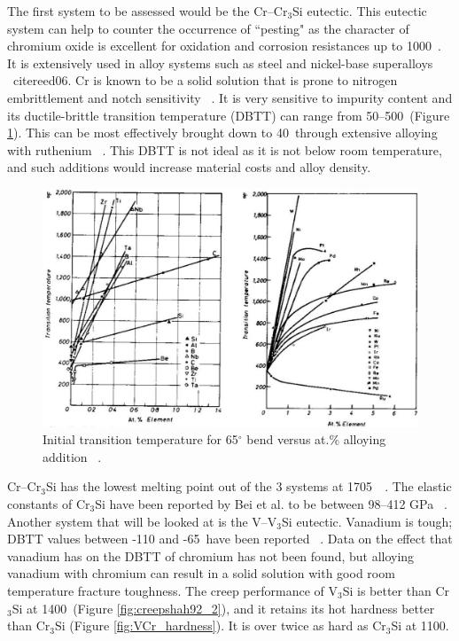 The first system to be assessed would be the Cr--Cr$_3$Si eutectic.  This eutectic system can help to counter the occurrence of ``pesting" as the character of chromium oxide is excellent for oxidation and corrosion resistances up to 1000\celsius ~\cite{raj95a}.  It is extensively used in alloy systems such as steel and nickel-base superalloys ~cite{reed06}. Cr is known to be a solid solution that is prone to nitrogen embrittlement and notch sensitivity ~\cite{abrahamson57}.  It is very sensitive to impurity content and its ductile-brittle transition temperature (DBTT) can range from 50--500\celsius\ (Figure \ref{fig:Cr_ductility}).  This can be most effectively brought down to 40\celsius\ through extensive alloying with ruthenium ~\cite{abrahamson57}.  This DBTT is not ideal as it is not below room temperature, and such additions would increase material costs and alloy density.
%
\begin{figure}[H]
\begin{center}
\includegraphics[width=.98\textwidth]{Cr_ductility}
\vspace{-2mm}
\caption{Initial transition temperature for 65$^\circ$ bend versus at.\% alloying addition ~\cite{abrahamson57}. }\label{fig:Cr_ductility}
\end{center}
\end{figure}
\vspace{-8mm}
%
Cr--Cr$_3$Si has the lowest melting point out of the 3 systems at 1705\celsius\ ~\cite{gokhale90}. The elastic constants of Cr$_3$Si have been reported by Bei et al.  to be between 98--412 GPa ~\cite{bei04}. Another system that will be looked at is the V--V$_3$Si eutectic.  Vanadium is tough; DBTT values between -110 and -65\celsius\ have been reported ~\cite{dunn61}. Data on the effect that vanadium has on the DBTT of chromium has not been found, but alloying vanadium with chromium can result in a solid solution with good room temperature fracture toughness. The creep performance of V$_3$Si is better than Cr$_3$Si at 1400\celsius\ (Figure \ref{fig:creepshah92_2}), and it retains its hot hardness better than Cr$_3$Si (Figure \ref{fig:VCr_hardness}). It is over twice as hard as Cr$_3$Si at 1100\celsius.  
